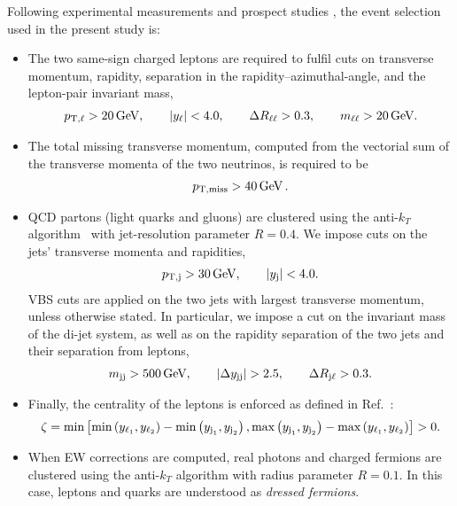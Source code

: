 \documentclass[11pt,epsf]{article}
\begin{document}
    Following experimental measurements \cite{Aad:2014zda,Aaboud:2016ffv,Khachatryan:2014sta,CMS:2017adb} and prospect studies \cite{ATL-PHYS-PUB-2017-023}, the event selection used in the present study is:

    \begin{itemize}
        \item The two same-sign charged leptons are required to fulfil
          cuts on transverse momentum, rapidity, separation in the
          rapidity--azimuthal-angle, and the lepton-pair invariant mass, 
            \begin{align}
            \label{cut:1}
             p_{\text{T},\ell} >  20\,\text{GeV},\qquad |y_{\ell}| < 4.0, \qquad \Delta R_{\ell\ell}> 0.3, \qquad m_{\ell\ell}>20\,\text{GeV}.
            \end{align}
        \item The total missing transverse momentum, computed from the vectorial sum of the transverse momenta of the two neutrinos, is required to be
            \begin{align}
            \label{cut:2}
              p_{\rm T, miss} >  40\,\text{GeV}\,.
            \end{align}
        \item QCD partons (light quarks and gluons) are clustered  using the anti-$k_T$ algorithm~\cite{Cacciari:2008gp} with jet-resolution parameter $R=0.4$.
        We impose cuts on the jets' transverse momenta and rapidities,  
            \begin{align}
            \label{cut:3}
             p_{\text{T},\text{j}} >  30\,\text{GeV}, \qquad |y_\text{j}| < 4.0. 
            \end{align}
            VBS cuts are applied on the two jets with largest transverse momentum, unless otherwise stated. In particular, we impose a cut on the 
             in\-vari\-ant mass of the di-jet system, as well as on the rapidity separation of the two jets and their separation from leptons,
            \begin{align}
            \label{cut:4}
             m_{\text{j} \text{j}} >  500\,\text{GeV},\qquad |\Delta y_{\text{j} \text{j}}| > 2.5, \qquad \Delta R_{\text{j}\ell} > 0.3 .
            \end{align}
        \item Finally, the centrality of the leptons is enforced as defined in Ref.~\cite{ATL-PHYS-PUB-2017-023}:
            \begin{align}
            \label{cut:5}
             \zeta = \text{min}\left[\text{min}\left(y_{\ell_1},y_{\ell_2}\right) - \text{min}\left(y_{\text{j}_1},y_{\text{j}_2}\right), \text{max}\left(y_{\text{j}_1},y_{\text{j}_2}\right) - \text{max}\left(y_{\ell_1},y_{\ell_2}\right)\right]> 0 .
            \end{align}
            
        \item When EW corrections are computed, real photons and charged fermions are clustered using the anti-$k_T$ algorithm with
            radius parameter $R=0.1$. In this case, leptons and quarks are understood as {\it dressed fermions}.
    \end{itemize}
\end{document}
